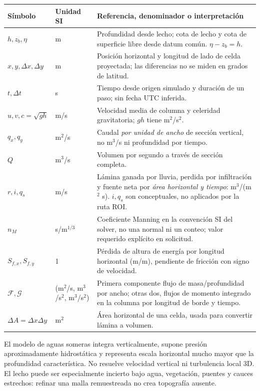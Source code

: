 \documentclass[11pt,a4paper]{article}
\begin{document}
\begin{longtable}{p{.18\linewidth}p{.17\linewidth}p{.57\linewidth}}
\toprule Símbolo & Unidad SI & Referencia, denominador o interpretación\\\midrule\endhead
$h,z_b,\eta$ & m & Profundidad desde lecho; cota de lecho y cota de superficie libre desde datum común. $\eta-z_b=h$.\\
$x,y,\Delta x,\Delta y$ & m & Posición horizontal y longitud de lado de celda proyectada; las diferencias no se miden en grados de latitud.\\
$t,\Delta t$ & s & Tiempo desde origen simulado y duración de un paso; sin fecha UTC inferida.\\
$u,v,c=\sqrt{gh}$ & m/s & Velocidad media de columna y celeridad gravitatoria; $gh$ tiene m$^2$/s$^2$.\\
$q_x,q_y$ & m$^2$/s & Caudal \emph{por unidad de ancho} de sección vertical, no m$^3$/s ni profundidad por tiempo.\\
$Q$ & m$^3$/s & Volumen por segundo a través de sección completa.\\
$r,i,q_s$ & m/s & Lámina ganada por lluvia, perdida por infiltración y fuente neta por \emph{área horizontal y tiempo}: m$^3$/(m$^2$ s). $i,q_s$ son conceptuales, no aplicados por la ruta ROI.\\
$n_M$ & s/m$^{1/3}$ & Coeficiente Manning en la convención SI del solver, no una normal ni un conteo; valor requerido explícito en solicitud.\\
$S_{f,x},S_{f,y}$ & 1 & Pérdida de altura de energía por longitud horizontal (m/m), pendiente de fricción con signo de velocidad.\\
$\mathcal F,\mathcal G$ & (m$^2$/s, m$^3$/s$^2$, m$^3$/s$^2$) & Primera componente flujo de masa/profundidad por ancho; otras dos, flujos de momento integrado en la columna por longitud de borde y tiempo.\\
$\Delta A=\Delta x\Delta y$ & m$^2$ & Área horizontal de una celda, usada para convertir lámina a volumen.\\\bottomrule
\end{longtable}

El modelo de aguas someras integra verticalmente, supone presión aproximadamente hidrostática y representa escala horizontal mucho mayor que la profundidad característica. No resuelve velocidad vertical ni turbulencia local 3D. El lecho puede ser especialmente incierto bajo agua, vegetación, puentes y cauces estrechos: refinar una malla remuestreada no crea topografía ausente.
\end{document}
